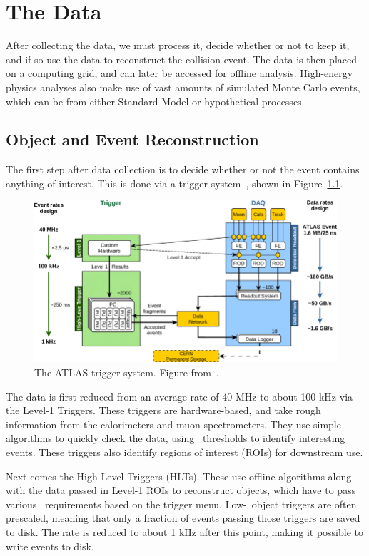 \chapter{The Data}

After collecting the data, we must process it, decide whether or not to keep it, and if so use the data to reconstruct the collision event. The data is then placed on a computing grid, and can later be accessed for offline analysis. High-energy physics analyses also make use of vast amounts of simulated Monte Carlo events, which can be from either Standard Model or hypothetical processes.

\section{Object and Event Reconstruction}

The first step after data collection is to decide whether or not the event contains anything of interest. This is done via a trigger system~\cite{ATLAS_triggers}, shown in Figure~\ref{fig:triggers}.

\begin{figure}[htbp]
    \centering
    \includegraphics[width=\linewidth]{Images/ATLAS/triggers.png}
    \caption{The ATLAS trigger system. Figure from~\cite{ATLAS_triggers_figure}.}
    \label{fig:triggers}
\end{figure}

The data is first reduced from an average rate of 40 MHz to about 100 kHz via the Level-1 Triggers. These triggers are hardware-based, and take rough information from the calorimeters and muon spectrometers. They use simple algorithms to quickly check the data, using \pt\ thresholds to identify interesting events. These triggers also identify regions of interest (ROIs) for downstream use.

Next comes the High-Level Triggers (HLTs). These use offline algorithms along with the data passed in Level-1 ROIs to reconstruct objects, which have to pass various \pt\ requirements based on the trigger menu. Low-\pt\ object triggers are often prescaled, meaning that only a fraction of events passing those triggers are saved to disk. The rate is reduced to about 1 kHz after this point, making it possible to write events to disk.

